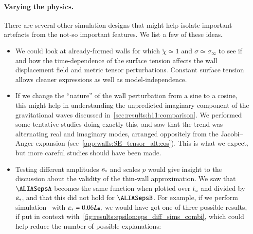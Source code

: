 \paragraph{Varying the physics.} %
There are several other simulation designs that might help isolate important artefacts from the not-so important features. We list a few of these ideas.
\begin{itemize}
    \item We could look at already-formed walls for which $\breve{\chi}\simeq 1$ and  $\sigma \simeq \sigma_\infty$ to see if and how the time-dependence of the surface tension affects the wall displacement field and metric tensor perturbations. Constant surface tension allows cleaner expressions as well as model-independence. 
    \item If we change the ``nature'' of the wall perturbation from a sine to a cosine, this might help in understanding the unpredicted imaginary component of the gravitational waves discussed in~\cref{sec:results:h11:comparison}. We performed some tentative studies doing exactly this, and saw that the trend was alternating real and imaginary modes, arranged oppositely from the Jacobi--Anger expansion (see~\cref{app:walls:SE_tensor_alt:cos}). This is what we expect, but more careful studies should have been made.
    \item Testing different amplitudes $\varepsilon_\ast$ and scales $p$ would give insight to the discussion about the validity of the thin-wall approximation. We saw that $\epsA$ becomes the same function when plotted over $t_\omega$ and divided by $\varepsilon_\ast$, and that this did not hold for $\epsB$. For example, if we perform simulation~ with $\varepsilon_\ast=0.06L_\#$, we would have got one of three possible results, if put in context with~\cref{fig:results:epsilon:eps_diff_sims_combi}, which could help reduce the number of possible explanations: %

\end{itemize}
